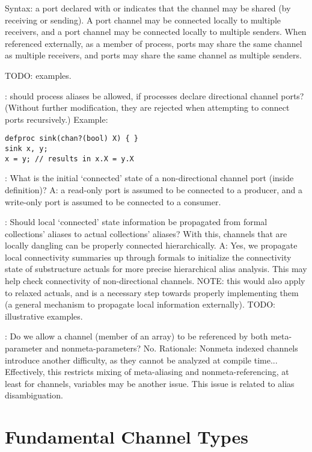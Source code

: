 Syntax: a port declared with  or \ttt{!!} indicates that
the channel may be shared (by receiving or sending).  
A  port channel may be connected locally to multiple receivers, 
and a \ttt{!!} port channel may be connected locally to multiple senders.  
When referenced externally, as a member of process, 
 ports may share the same channel as multiple receivers, and 
\ttt{!!} ports may share the same channel as multiple senders.  

TODO: examples.  

: should process aliases be allowed, 
if processes declare directional channel ports?
(Without further modification, they are rejected when attempting to 
connect ports recursively.)
Example:

\begin{verbatim}
defproc sink(chan?(bool) X) { }
sink x, y;
x = y; // results in x.X = y.X
\end{verbatim}

: What is the initial `connected' state of a non-directional
channel port (inside definition)?
A: a read-only port is assumed to be connected to a producer, 
and a write-only port is assumed to be connected to a consumer.  

: Should local `connected' state information be propagated
from formal collections' aliases to actual collections' aliases?
With this, channels that are locally dangling can be properly connected
hierarchically.  
A: Yes, we propagate local connectivity summaries up through formals
to initialize the connectivity state of substructure actuals
for more precise hierarchical alias analysis.  
This may help check connectivity of non-directional channels.  
NOTE: this would also apply to relaxed actuals, and is a necessary step
towards properly implementing them (a general mechanism to propagate
local information externally).  
TODO: illustrative examples.  

: Do we allow a channel (member of an array) to be referenced 
by both meta-parameter and nonmeta-parameters?  No.
Rationale: Nonmeta indexed channels introduce another difficulty, 
as they cannot be analyzed at compile time...
Effectively, this restricts mixing of meta-aliasing and nonmeta-referencing, 
at least for channels, variables may be another issue.
This issue is related to alias disambiguation.  

\section{Fundamental Channel Types}
\label{sec:channels:fundamental}

